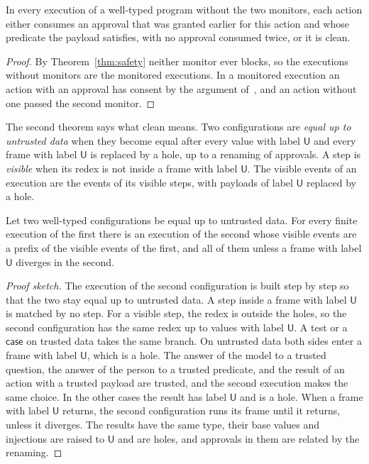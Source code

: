 \documentclass[acmsmall,nonacm,screen]{acmart}
\newcommand{\kw}[1]{\mathsf{#1}}
\newcommand{\U}{\kw{U}}
\begin{document}
\begin{theorem}
\label{thm:selective}
In every execution of a well-typed program without the two monitors, each action either
consumes an approval that was granted earlier for this action and whose predicate the payload
satisfies, with no approval consumed twice, or it is clean.
\end{theorem}

\begin{proof}
By Theorem~\ref{thm:safety} neither monitor ever blocks, so the executions without monitors are
the monitored executions. In a monitored execution an action with an approval has consent by
the argument of~\citet{tpp4}, and an action without one passed the second monitor.
\end{proof}

The second theorem says what clean means. Two configurations are \emph{equal up to untrusted
data} when they become equal after every value with label $\U$ and every frame with label $\U$
is replaced by a hole, up to a renaming of approvals. A step is \emph{visible} when its redex is
not inside a frame with label $\U$. The visible events of an execution are the events of its
visible steps, with payloads of label $\U$ replaced by a hole.

\begin{theorem}[Independence]
\label{thm:indep}
Let two well-typed configurations be equal up to untrusted data. For every finite execution of
the first there is an execution of the second whose visible events are a prefix of the visible
events of the first, and all of them unless a frame with label $\U$ diverges in the second.
\end{theorem}

\begin{proof}[Proof sketch]
The execution of the second configuration is built step by step so that the two stay equal up
to untrusted data. A step inside a frame with label $\U$ is matched by no step. For a visible
step, the redex is outside the holes, so the second configuration has the same redex up to
values with label $\U$. A test or a $\kw{case}$ on trusted data takes the same branch. On
untrusted data both sides enter a frame with label $\U$, which is a hole. The answer of the
model to a trusted question, the answer of the person to a trusted predicate, and the result of
an action with a trusted payload are trusted, and the second execution makes the same choice.
In the other cases the result has label $\U$ and is a hole. When a frame with label $\U$
returns, the second configuration runs its frame until it returns, unless it diverges. The
results have the same type, their base values and injections are raised to $\U$ and are holes,
and approvals in them are related by the renaming.
\end{proof}
\end{document}
